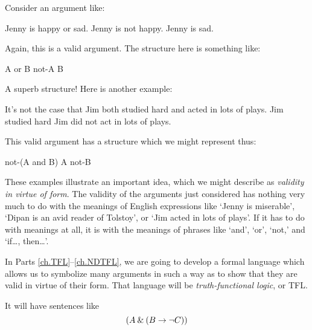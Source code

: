  Consider an argument like:
	\begin{earg}
		\prem Jenny is  happy or sad.
		\prem Jenny is not happy.
		\conc Jenny is sad.
	\end{earg}
Again, this is a valid argument. The structure here is something like:
	\begin{earg}
		\prem A or B
		\prem not-A
		\conc B
	\end{earg}
A superb structure! Here is another example:
	\begin{earg}
		\prem It's not the case that Jim both studied hard and acted in lots of plays.
		\prem Jim studied hard
		\conc Jim did not act in lots of plays.
	\end{earg}
This valid argument has a structure which we might represent thus:
	\begin{earg}
		\prem not-(A and B)
		\prem A
		\conc not-B
	\end{earg}
These examples illustrate an important idea, which we might describe as \emph{validity in virtue of form}. The validity of the arguments just considered has nothing very much to do with the meanings of English expressions like `Jenny is miserable', `Dipan is an avid reader of Tolstoy', or `Jim acted in lots of plays'. If it has to do with meanings at all, it is with the meanings of phrases like `and', `or', `not,' and `if\ldots, then\ldots'.

In Parts \ref{ch.TFL}--\ref{ch.NDTFL}, we are going to develop a formal language which allows us to symbolize many arguments in such a way as to show that they are valid in virtue of their form. That language will be \emph{truth-functional logic}, or TFL.

It will have sentences like $$(A\mathbin{\&} (B\rightarrow\neg C))$$






